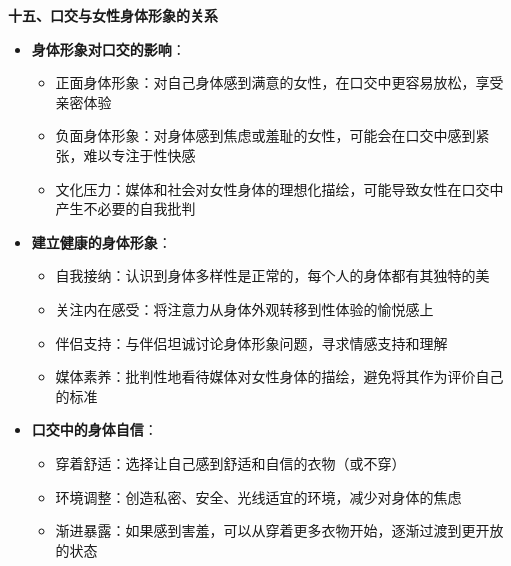 \documentclass[12pt,UTF8]{ctexbook}
\begin{document}
  \textbf{十五、口交与女性身体形象的关系}
  \begin{itemize}
  \item \textbf{身体形象对口交的影响}：
    \begin{itemize}
    \item 正面身体形象：对自己身体感到满意的女性，在口交中更容易放松，享受亲密体验
    \item 负面身体形象：对身体感到焦虑或羞耻的女性，可能会在口交中感到紧张，难以专注于性快感
    \item 文化压力：媒体和社会对女性身体的理想化描绘，可能导致女性在口交中产生不必要的自我批判
    \end{itemize}
  \item \textbf{建立健康的身体形象}：
    \begin{itemize}
    \item 自我接纳：认识到身体多样性是正常的，每个人的身体都有其独特的美
    \item 关注内在感受：将注意力从身体外观转移到性体验的愉悦感上
    \item 伴侣支持：与伴侣坦诚讨论身体形象问题，寻求情感支持和理解
    \item 媒体素养：批判性地看待媒体对女性身体的描绘，避免将其作为评价自己的标准
    \end{itemize}
  \item \textbf{口交中的身体自信}：
    \begin{itemize}
    \item 穿着舒适：选择让自己感到舒适和自信的衣物（或不穿）
    \item 环境调整：创造私密、安全、光线适宜的环境，减少对身体的焦虑
    \item 渐进暴露：如果感到害羞，可以从穿着更多衣物开始，逐渐过渡到更开放的状态
    \end{itemize}
  \end{itemize}
\end{document}
